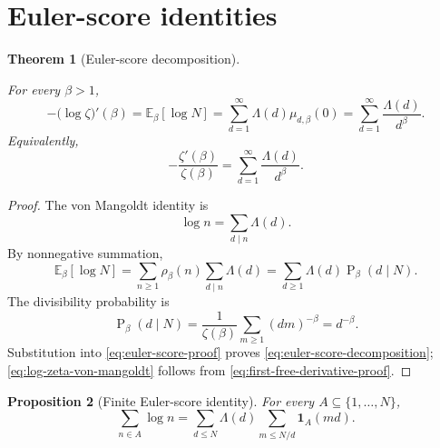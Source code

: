 \documentclass[11pt]{article}
\numberwithin{equation}{section}
\newtheorem{theorem}{Theorem}[section]
\newtheorem{proposition}[theorem]{Proposition}
\theoremstyle{definition}
\theoremstyle{remark}
\DeclareMathOperator{\Prob}{P}
\newcommand{\E}{\mathbb E}
\newcommand{\1}{\mathbf 1}
\begin{document}
\section{Euler-score identities}

\begin{theorem}[Euler-score decomposition]
\label{thm:euler-score-decomposition}



For every \(\beta>1\),
\begin{equation}
\label{eq:euler-score-decomposition}
-\bigl(\log\zeta\bigr)'(\beta)
=\E_\beta[\log N]
=\sum_{d=1}^{\infty}\Lambda(d)\mu_{d,\beta}(0)
=\sum_{d=1}^{\infty}\frac{\Lambda(d)}{d^\beta}.
\end{equation}
Equivalently,
\begin{equation}
\label{eq:log-zeta-von-mangoldt}
-\frac{\zeta'(\beta)}{\zeta(\beta)}
=\sum_{d=1}^{\infty}\frac{\Lambda(d)}{d^\beta}.
\end{equation}
\end{theorem}

\begin{proof}
The von Mangoldt identity is
\begin{equation}
\label{eq:mangoldt-identity}
\log n=\sum_{d\mid n}\Lambda(d).
\end{equation}
By nonnegative summation,
\begin{equation}
\label{eq:euler-score-proof}
\E_\beta[\log N]
=\sum_{n\ge1}\rho_\beta(n)\sum_{d\mid n}\Lambda(d)
=\sum_{d\ge1}\Lambda(d)\Prob_\beta(d\mid N).
\end{equation}
The divisibility probability is
\begin{equation}
\label{eq:divisibility-probability}
\Prob_\beta(d\mid N)
=\frac1{\zeta(\beta)}\sum_{m\ge1}(dm)^{-\beta}
=d^{-\beta}.
\end{equation}
Substitution into \eqref{eq:euler-score-proof} proves \eqref{eq:euler-score-decomposition}; \eqref{eq:log-zeta-von-mangoldt} follows from \eqref{eq:first-free-derivative-proof}.
\end{proof}

\begin{proposition}[Finite Euler-score identity]
\label{prop:finite-euler-score}
For every \(A\subseteq\{1,\ldots,N\}\),
\begin{equation}
\label{eq:finite-euler-score}
\sum_{n\in A}\log n
=\sum_{d\le N}\Lambda(d)\sum_{m\le N/d}\1_A(md).
\end{equation}
\end{proposition}
\end{document}
